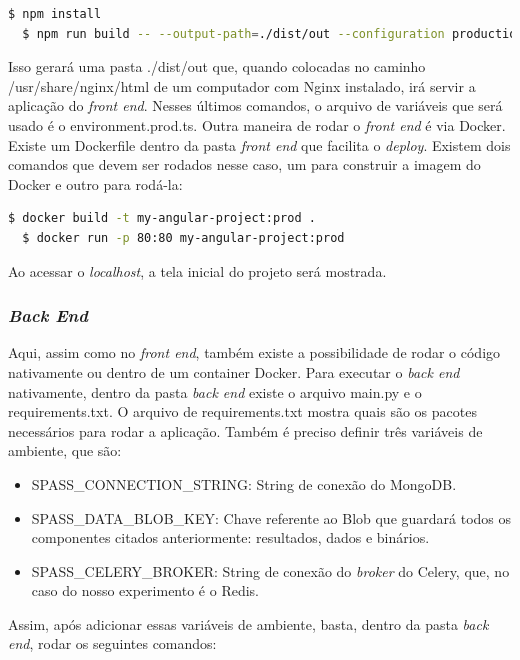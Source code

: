 \documentclass[11pt,twoside]{article}
\begin{document}
\begin{lstlisting}[language=bash]
  $ npm install 
  $ npm run build -- --output-path=./dist/out --configuration production
\end{lstlisting}

Isso gerará uma pasta ./dist/out que, quando colocadas no caminho /usr/share/nginx/html de um computador com Nginx instalado, irá servir a aplicação do \emph{front end}.
Nesses últimos comandos, o arquivo de variáveis que será usado é o environment.prod.ts.
Outra maneira de rodar o \emph{front end} é via Docker. Existe um Dockerfile dentro da pasta \emph{front end} que facilita o \emph{deploy}. Existem dois comandos que devem ser rodados nesse caso, um
para construir a imagem do Docker e outro para rodá-la:

\begin{lstlisting}[language=bash]
  $ docker build -t my-angular-project:prod .
  $ docker run -p 80:80 my-angular-project:prod
\end{lstlisting}

Ao acessar o \emph{localhost}, a tela inicial do projeto será mostrada.

\subsubsection{\emph{Back End}}

Aqui, assim como no \emph{front end}, também existe a possibilidade de rodar o código nativamente ou dentro de um container Docker. Para executar o \emph{back end} nativamente, dentro da pasta \emph{back end}
existe o arquivo main.py e o requirements.txt. O arquivo de requirements.txt mostra quais são os pacotes necessários para rodar a aplicação. Também é preciso definir três
variáveis de ambiente, que são:

\begin{itemize}
  \item SPASS\_CONNECTION\_STRING: String de conexão do MongoDB.
  \item SPASS\_DATA\_BLOB\_KEY: Chave referente ao Blob que guardará todos os componentes citados anteriormente: resultados, dados e binários.
  \item SPASS\_CELERY\_BROKER: String de conexão do \emph{broker} do Celery, que, no caso do nosso experimento é o Redis.
\end{itemize}

Assim, após adicionar essas variáveis de ambiente, basta, dentro da pasta \emph{back end}, rodar os seguintes comandos:
\end{document}

